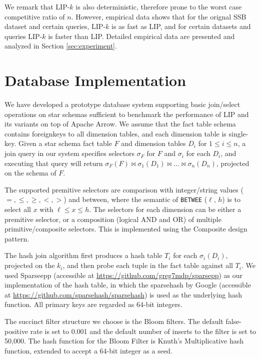 \documentclass[10pt]{article}
\newcommand{\JOIN}{\bowtie}
\begin{document}
We remark that LIP-$k$ is also deterministic, therefore prone to the worst case competitive ratio of $n$. However, empirical data shows that for the orignal SSB dataset and certain queries, LIP-$k$ is as fast as LIP, and for certain datasets and queries LIP-$k$ is faster than LIP. Detailed empirical data are presented and analyzed in Section \ref{sec:experiment}.

\section{Database Implementation}

We have developed a prototype database system supporting basic join/select operations on star schemas sufficient to benchmark the performance of LIP and its variants on top of Apache Arrow. We assume that the fact table schema contains foreignkeys to all dimension tables, and each dimension table is single-key. Given a star schema fact table $F$ and dimension tables $D_i$ for $1 \leq i \leq n$, a join query in our system specifies selectors $\sigma_F$ for $F$ and $\sigma_i$ for each $D_i$, and executing that query will return $\sigma_F(F) \JOIN \sigma_1(D_1) \JOIN \dots \JOIN \sigma_n(D_n)$, projected on the schema of $F$. 

The supported premitive selectors are comparison with integer/string values ($=, \leq, \geq, <, >$) and between, where the semantic of \texttt{BETWEE} ($\ell$, $h$) is to select all $x$ with $\ell \leq x \leq h$. The selectors for each dimension can be either a premitive selector, or a composition (logical AND and OR) of multiple primitive/composite selectors. This is implemented using the Composite design pattern.


The hash join algorithm first produces a hash table $T_i$ for each $\sigma_i(D_i)$, projected on the $k_i$, and then probe each tuple in the fact table against all $T_i$. We used Sparseepp (accessible at \url{https://github.com/greg7mdp/sparsepp}) as our implementation of the hash table, in which the sparsehash by Google (accessible at \url{https://github.com/sparsehash/sparsehash}) is used as the underlying hash function. All primary keys are regarded as 64-bit integers.

The succinct filter structure we choose is the Bloom filters. The default false-positive rate is set to 0.001 and the default number of inserts to the filter is set to 50,000. The hash function for the Bloom Filter is Knuth's Multiplicative hash function, extended to accept a 64-bit integer as a seed. 
\end{document}
